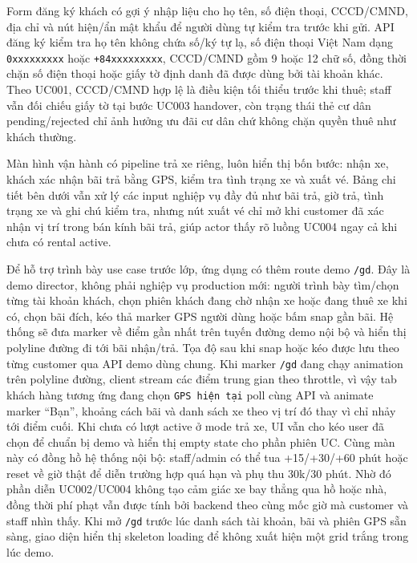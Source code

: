 Form đăng ký khách có gợi ý nhập liệu cho họ tên, số điện thoại, CCCD/CMND, địa
chỉ và nút hiện/ẩn mật khẩu để người dùng tự kiểm tra trước khi gửi. API đăng ký kiểm tra họ tên không chứa số/ký tự lạ, số điện thoại Việt Nam
dạng \texttt{0xxxxxxxxx} hoặc \texttt{+84xxxxxxxxx}, CCCD/CMND gồm 9 hoặc 12 chữ
số, đồng thời chặn số điện thoại hoặc giấy tờ định danh đã được dùng bởi tài
khoản khác. Theo UC001, CCCD/CMND hợp lệ là điều kiện tối thiểu trước khi thuê;
staff vẫn đối chiếu giấy tờ tại bước UC003 handover, còn trạng thái thẻ cư dân
pending/rejected chỉ ảnh hưởng ưu đãi cư dân chứ không chặn quyền thuê như khách thường.

Màn hình vận hành có pipeline trả xe riêng, luôn hiển thị bốn bước: nhận xe,
khách xác nhận bãi trả bằng GPS, kiểm tra tình trạng xe và xuất vé. Bảng chi
tiết bên dưới vẫn xử lý các input nghiệp vụ đầy đủ như bãi trả, giờ trả, tình
trạng xe và ghi chú kiểm tra, nhưng nút xuất vé chỉ mở khi customer đã xác nhận
vị trí trong bán kính bãi trả, giúp actor thấy rõ luồng UC004 ngay cả khi chưa
có rental active.

Để hỗ trợ trình bày use case trước lớp, ứng dụng có thêm route demo
\texttt{/gd}. Đây là demo director, không phải nghiệp vụ production mới: người
trình bày tìm/chọn từng tài khoản khách, chọn phiên khách đang chờ nhận xe hoặc
đang thuê xe khi có, chọn bãi đích, kéo thả marker GPS người dùng hoặc bấm snap
gần bãi. Hệ thống sẽ đưa marker về điểm gần nhất trên tuyến đường demo nội bộ và
hiển thị polyline đường đi tới bãi nhận/trả. Tọa độ sau khi snap hoặc kéo được
lưu theo từng customer qua API demo dùng chung. Khi marker \texttt{/gd} đang
chạy animation trên polyline đường, client stream các điểm trung gian theo
throttle, vì vậy tab khách hàng tương ứng đang chọn \texttt{GPS hiện tại} poll
cùng API và animate marker ``Bạn'', khoảng cách bãi và danh sách xe theo vị trí
đó thay vì chỉ nhảy tới điểm cuối. Khi chưa có lượt
active ở mode trả xe, UI vẫn cho kéo user đã chọn để chuẩn bị demo và hiển thị
empty state cho phần phiên UC. Cùng màn này có đồng hồ hệ thống nội bộ:
staff/admin có thể tua +15/+30/+60 phút hoặc reset về giờ thật để diễn trường
hợp quá hạn và phụ thu 30k/30 phút. Nhờ đó phần diễn UC002/UC004 không tạo cảm
giác xe bay thẳng qua hồ hoặc nhà, đồng thời phí phạt vẫn được tính bởi backend
theo cùng mốc giờ mà customer và staff nhìn thấy. Khi mở \texttt{/gd} trước lúc
danh sách tài khoản, bãi và phiên GPS sẵn sàng, giao diện hiển thị skeleton loading để không xuất hiện
một grid trắng trong lúc demo.

